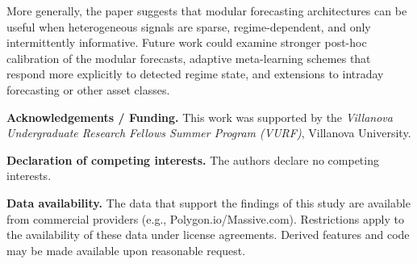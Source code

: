 \documentclass[review]{elsarticle}
\begin{document}
More generally, the paper suggests that modular forecasting architectures can be useful when heterogeneous signals are sparse, regime-dependent, and only intermittently informative. Future work could examine stronger post-hoc calibration of the modular forecasts, adaptive meta-learning schemes that respond more explicitly to detected regime state, and extensions to intraday forecasting or other asset classes.

\newpage
\vspace{1em}
\noindent\textbf{Acknowledgements / Funding.}
This work was supported by the \emph{Villanova Undergraduate Research Fellows Summer Program (VURF)}, Villanova University.

\vspace{0.5em}
\noindent\textbf{Declaration of competing interests.}
The authors declare no competing interests.

\vspace{0.5em}
\noindent\textbf{Data availability.}
The data that support the findings of this study are available from commercial providers (e.g., Polygon.io/Massive.com). Restrictions apply to the availability of these data under license agreements. Derived features and code may be made available upon reasonable request.
\end{document}
